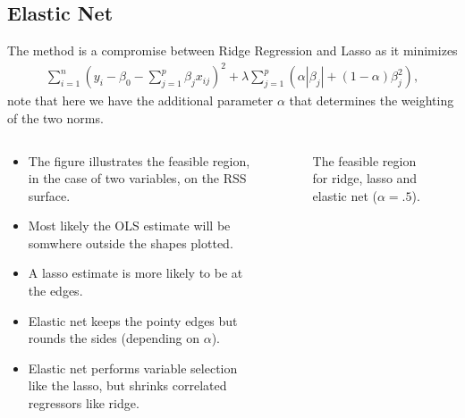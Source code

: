 \documentclass[aspectratio=169,10pt]{beamer}
\begin{document}
\subsection{Elastic Net}
\begin{frame}{\secname}{\subsecname}
  The method is a compromise between Ridge Regression and Lasso as it minimizes
  \begin{align*}
    \sum_{i=1}^n \left( y_i - \beta_0 - \sum_{j=1}^p \beta_j x_{ij}\right)^2 + \lambda \sum_{j=1}^p \left(\alpha |\beta_j| + (1 - \alpha)\beta_j^2\right),
  \end{align*}
  note that here we have the additional parameter $\alpha$ that determines the weighting of the two norms.
\end{frame}

\begin{frame}{\secname}{\subsecname}
  \begin{columns}
    \begin{column}{.5\textwidth}
      \begin{itemize}
        \item The figure illustrates the feasible region, in the case of two variables, on the RSS surface.
        \item Most likely the OLS estimate will be somwhere outside the shapes plotted.
        \item A lasso estimate is more likely to be at the edges.
        \item Elastic net keeps the pointy edges but rounds the sides (depending on $\alpha$).
        \item Elastic net performs variable selection like the lasso, but shrinks correlated regressors like ridge.
      \end{itemize}
    \end{column}
    \begin{column}{.5\textwidth}
      \begin{figure}
        \centering
        \caption{The feasible region for {\color{orange} ridge}, {\color{violet} lasso} and {\color{teal} elastic net} ($\alpha = .5$).}
      \end{figure}
    \end{column}
  \end{columns}
\end{frame}
\end{document}
